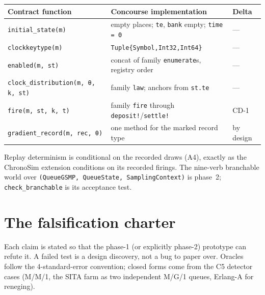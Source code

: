 \documentclass[11pt]{article}
\newcommand{\code}[1]{\texttt{#1}}
\begin{document}
\begin{center}
\small
\begin{tabular}{@{}lll@{}}
\toprule
Contract function & Concourse implementation & Delta \\
\midrule
\code{initial\_state(m)} & empty places; \code{te}, \code{bank} empty; \code{time = 0} & --- \\
\code{clockkeytype(m)} & \code{Tuple\{Symbol,Int32,Int64\}} & --- \\
\code{enabled(m, st)} & concat of family \code{enumerate}s, registry order & --- \\
\code{clock\_distribution(m, θ, k, st)} & family \code{law}; anchors from \code{st.te} & --- \\
\code{fire(m, st, k, t)} & family \code{fire} through \code{deposit!}/\code{settle!} & CD-1 \\
\code{gradient\_record(m, rec, θ)} & one method for the marked record type & by design \\
\bottomrule
\end{tabular}
\end{center}

Replay determinism is conditional on the recorded draws (A4), exactly as
the ChronoSim extension conditions on its recorded firings. The nine-verb
branchable world over \code{(QueueGSMP, QueueState, SamplingContext)} is
phase~2; \code{check\_branchable} is its acceptance test.

\section{The falsification charter}
\label{sec:charter}

Each claim is stated so that the phase-1 (or explicitly phase-2) prototype
can refute it. A failed test is a design discovery, not a bug to paper over.
Oracles follow the 4-standard-error convention; closed forms come from the
C5 detector cases (M/M/1, the SITA farm as two independent M/G/1 queues,
Erlang-A for reneging).
\end{document}
